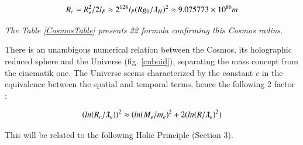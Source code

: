 \documentclass[a4paper,9pt]{article}
\begin{document}
 \begin{equation}\label{Eq6}
R_c = R_e^2/2l_P \approx 2^{128} l_P (Rg_0/ \lambdabar_H)^2 \approx 9.075773 \times 10^{86} m 
 \end{equation}
 
 \textit{The Table \ref{CosmosTable} presents 22 formula confirming this Cosmos radius.}
 
There is an unambigous numerical relation between the Cosmos, its holographic reduced sphere and the Universe (fig. \ref{cuboid}), separating the mass concept from the cinematik one. The Universe seems characterized by the constant $c$ in the equivalence between the spatial and temporal terms, hence the following 2 factor \cite{Sanchez3}:

\begin{equation}\label{Eq7}
(ln(R_c/\lambdabar_e))^2 \approx (ln(M_e/m_e)^2 + 2(ln(R/\lambdabar_e)^2)
\end{equation}

This will be related to the following Holic Principle (Section 3). 
\end{document}
